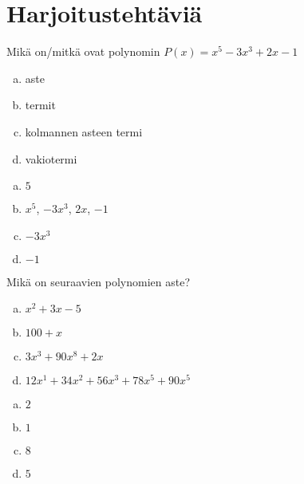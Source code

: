 
\section{Harjoitustehtäviä}

\begin{tehtava}
	Mikä on/mitkä ovat polynomin $P(x) = x^5-3x^3+2x-1$
	\begin{enumerate}[a)]
		\item aste
		\item termit
		\item kolmannen asteen termi
		\item vakiotermi
	\end{enumerate}

	\begin{vastaus}
		\begin{enumerate}[a)]
			\item $5$
			\item $x^5$, $-3x^3$, $2x$, $-1$
			\item $-3x^3$
			\item $-1$
		\end{enumerate}
	\end{vastaus}
\end{tehtava}

\begin{tehtava}
	Mikä on seuraavien polynomien aste?
	\begin{enumerate}[a)]
		\item $x^2 + 3x - 5$
		\item $100 + x$
		\item $3x^3 + 90x^8 + 2x$
		\item $12x^1 + 34x^2 + 56x^3 + 78x^5 + 90x^5$
	\end{enumerate}

	\begin{vastaus}
		\begin{enumerate}[a)]
			\item $2$
			\item $1$
			\item $8$
			\item $5$
		\end{enumerate}
	\end{vastaus}
\end{tehtava}

